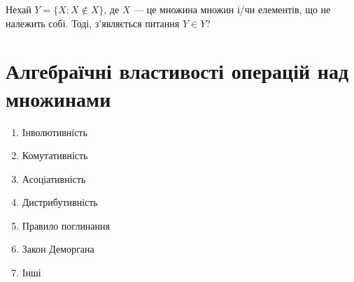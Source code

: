 Нехай $Y = \{X: X \not\in X\}$, де $X$ --- це множина множин і/чи елементів, що не належить собі. Тоді, з'являється питання $Y \in Y$?

\section{Алгебраїчні властивості операцій над множинами}

\begin{enumerate}
    \item Інволютивність
    \item Комутативність
    \item Асоціативність
    \item Дистрибутивність
    \item Правило поглинання
    \item Закон Деморгана
    \item Інші
\end{enumerate}








